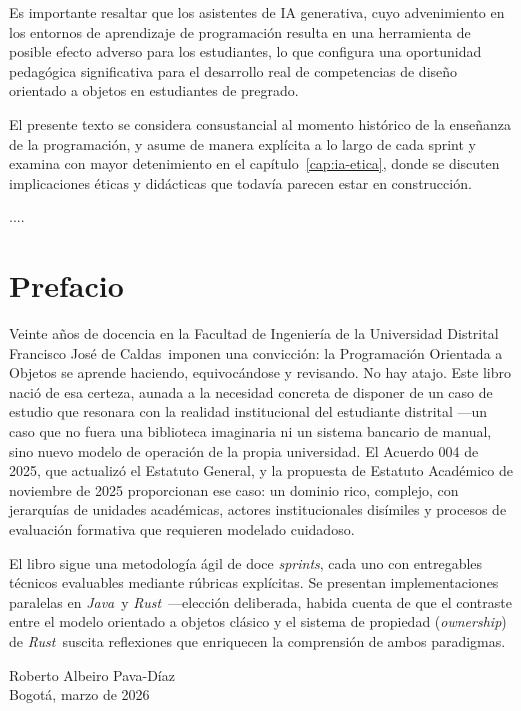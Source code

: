 \documentclass[12pt, twoside, openright]{book}
\newcommand{\ud}{Universidad Distrital Francisco José de Caldas}
\DeclareRobustCommand{\java}{\textit{Java}}
\DeclareRobustCommand{\rust}{\textit{Rust}}
\begin{document}
Es importante resaltar que los asistentes de IA generativa, cuyo advenimiento en los entornos de aprendizaje de programación resulta en una herramienta de posible efecto adverso para los estudiantes, lo que  configura una oportunidad pedagógica significativa para el desarrollo real de competencias de diseño orientado a objetos en estudiantes de pregrado.

El presente texto  se considera consustancial al momento histórico de la enseñanza de la programación, y asume de manera explícita a lo largo de cada sprint y examina con mayor detenimiento en el capítulo~\ref{cap:ia-etica}, donde se discuten implicaciones éticas y didácticas que todavía parecen estar en construcción.

....

\cleardoublepage
\chapter*{Prefacio}

\noindent
Veinte años de docencia en la Facultad de Ingeniería de la \ud\ imponen
una convicción: la Programación Orientada a Objetos se aprende haciendo,
equivocándose y revisando. No hay atajo. Este libro nació de esa certeza,
aunada a la necesidad concreta de disponer de un caso de estudio que
resonara con la realidad institucional del estudiante distrital ---un
caso que no fuera una biblioteca imaginaria ni un sistema bancario de
manual, sino nuevo  modelo de operación de la propia universidad.
El Acuerdo 004 de 2025, que actualizó el Estatuto General, y la propuesta
de Estatuto Académico de noviembre de 2025 proporcionan ese caso: un dominio
rico, complejo, con jerarquías de unidades académicas, actores institucionales
disímiles y procesos de evaluación formativa que requieren modelado cuidadoso.

\bigskip\noindent
El libro sigue una metodología ágil de doce \textit{sprints}, cada uno
con entregables técnicos evaluables mediante rúbricas explícitas.
Se presentan implementaciones paralelas en \java\ y \rust\ ---elección
deliberada, habida cuenta de que el contraste entre el modelo orientado
a objetos clásico y el sistema de propiedad (\textit{ownership}) de \rust\
suscita reflexiones que enriquecen la comprensión de ambos paradigmas.

\bigskip\noindent
{\raggedleft
Roberto Albeiro Pava-Díaz\\
Bogotá, marzo de 2026\par}
\end{document}
